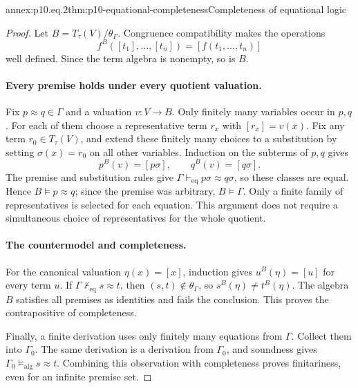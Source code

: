 \begin{annexitem}{annex:p10.eq.2}{thm:p10-equational-completeness}{Completeness of equational logic}
\begin{proof}
Let \(B=T_\tau(V)/\theta_\Gamma\).
Congruence compatibility makes the operations
\[
 f^B([t_1],\ldots,[t_n])=[f(t_1,\ldots,t_n)]
\]
well defined. Since the term algebra is nonempty, so is \(B\).

\paragraph{Every premise holds under every quotient valuation.}
Fix \(p\approx q\in\Gamma\) and a valuation \(v:V\to B\).
Only finitely many variables occur in \(p,q\).
For each of them choose a representative term \(r_x\) with
\([r_x]=v(x)\).
Fix any term \(r_0\in T_\tau(V)\), and extend these finitely many
choices to a substitution by setting \(\sigma(x)=r_0\) on all
other variables.
Induction on the subterms of \(p,q\) gives
\[
 p^B(v)=[p\sigma],\qquad q^B(v)=[q\sigma].
\]
The premise and substitution rules give
\(\Gamma\vdash_{\mathrm{eq}}p\sigma\approx q\sigma\), so these
classes are equal.
Hence \(B\models p\approx q\); since the premise was arbitrary,
\(B\models\Gamma\).
Only a finite family of representatives is selected for each
equation. This argument does not require a simultaneous choice of
representatives for the whole quotient.

\paragraph{The countermodel and completeness.}
For the canonical valuation \(\eta(x)=[x]\), induction gives
\(u^B(\eta)=[u]\) for every term \(u\).
If \(\Gamma\nvdash_{\mathrm{eq}}s\approx t\), then
\((s,t)\notin\theta_\Gamma\), so \(s^B(\eta)\ne t^B(\eta)\).
The algebra \(B\) satisfies all premises as identities and fails
the conclusion. This proves the contrapositive of completeness.

Finally, a finite derivation uses only finitely many equations
from \(\Gamma\).
Collect them into \(\Gamma_0\).
The same derivation is a derivation from \(\Gamma_0\), and soundness
gives \(\Gamma_0\models_{\mathrm{alg}}s\approx t\).
Combining this observation with completeness proves finitariness,
even for an infinite premise set.
\end{proof}
\end{annexitem}

